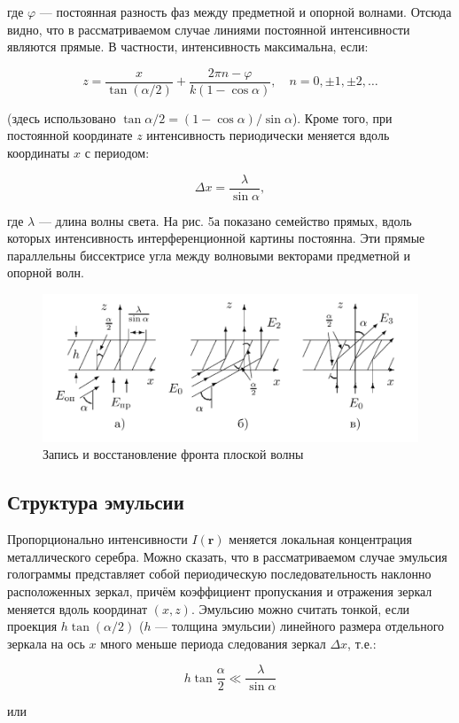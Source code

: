 \documentclass[a4paper,12pt]{article}
\begin{document}
где $\varphi$ — постоянная разность фаз между предметной и опорной волнами. Отсюда видно, что в рассматриваемом случае линиями постоянной интенсивности являются прямые. В частности, интенсивность максимальна, если:

$$
z = \frac{x}{\tan(\alpha/2)} + \frac{2\pi n - \varphi}{k(1 - \cos\alpha)}, \quad n = 0, \pm 1, \pm 2, \ldots
$$

(здесь использовано $\tan \alpha/2 = (1 - \cos \alpha)/\sin \alpha$). Кроме того, при постоянной координате $z$ интенсивность периодически меняется вдоль координаты $x$ с периодом:

$$
\Delta x = \frac{\lambda}{\sin \alpha},
$$

где $\lambda$ — длина волны света. На рис. 5а показано семейство прямых, вдоль которых интенсивность интерференционной картины постоянна. Эти прямые параллельны биссектрисе угла между волновыми векторами предметной и опорной волн.

\begin{figure}[h]
\centering
\includegraphics[width=0.8\linewidth]{img4.png}
\caption{Запись и восстановление фронта плоской волны}
\label{img4}
\end{figure}
    
\subsection{Структура эмульсии}
Пропорционально интенсивности $I(\mathbf{r})$ меняется локальная концентрация металлического серебра. Можно сказать, что в рассматриваемом случае эмульсия голограммы представляет собой периодическую последовательность наклонно расположенных зеркал, причём коэффициент пропускания и отражения зеркал меняется вдоль координат $(x, z)$. Эмульсию можно считать тонкой, если проекция $h \tan(\alpha/2)$ ($h$ — толщина эмульсии) линейного размера отдельного зеркала на ось $x$ много меньше периода следования зеркал $\Delta x$, т.е.:

$$
h \tan \frac{\alpha}{2} \ll \frac{\lambda}{\sin \alpha}
$$

или
\end{document}
